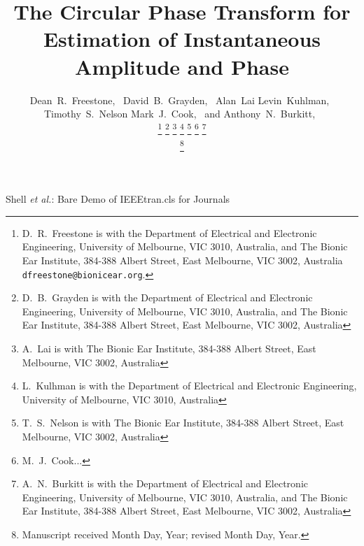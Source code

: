\documentclass[a4paper]{IEEEtran}
\begin{document}
\title{The Circular Phase Transform for Estimation of Instantaneous Amplitude and Phase}

\author{Dean~R.~Freestone,~
		David~B.~Grayden,~
        Alan~Lai
        Levin~Kuhlman,~
        Timothy~S.~Nelson
        Mark~J.~Cook,~
        and Anthony~N.~Burkitt,~
        

\thanks{D.\ R.\ Freestone is with the Department
of Electrical and Electronic Engineering, University of Melbourne, VIC 3010, Australia, and The Bionic Ear Institute, 384-388 Albert Street, East Melbourne, VIC 3002, Australia {\tt\small dfreestone@bionicear.org}.}  %
\thanks{D.\ B.\ Grayden is with the Department of Electrical and Electronic Engineering, University of Melbourne, VIC 3010, Australia, and The Bionic Ear Institute, 384-388 Albert Street, East Melbourne, VIC 3002, Australia}
\thanks{A.\ Lai is with The Bionic Ear Institute, 384-388 Albert Street, East Melbourne, VIC 3002, Australia}
\thanks{L.\ Kulhman is with the Department of Electrical and Electronic Engineering, University of Melbourne, VIC 3010, Australia}
\thanks{T.\ S.\ Nelson is with The Bionic Ear Institute, 384-388 Albert Street, East Melbourne, VIC 3002, Australia}
\thanks{M.\ J.\ Cook...}
\thanks{A.\ N.\ Burkitt is with the Department of Electrical and Electronic Engineering, University of Melbourne, VIC 3010, Australia, and The Bionic Ear Institute, 384-388 Albert Street, East Melbourne, VIC 3002, Australia}


\thanks{Manuscript received Month Day, Year; revised Month Day, Year.}}


%
{Shell \MakeLowercase{\textit{et al.}}: Bare Demo of IEEEtran.cls for Journals}

\maketitle
\end{document}
